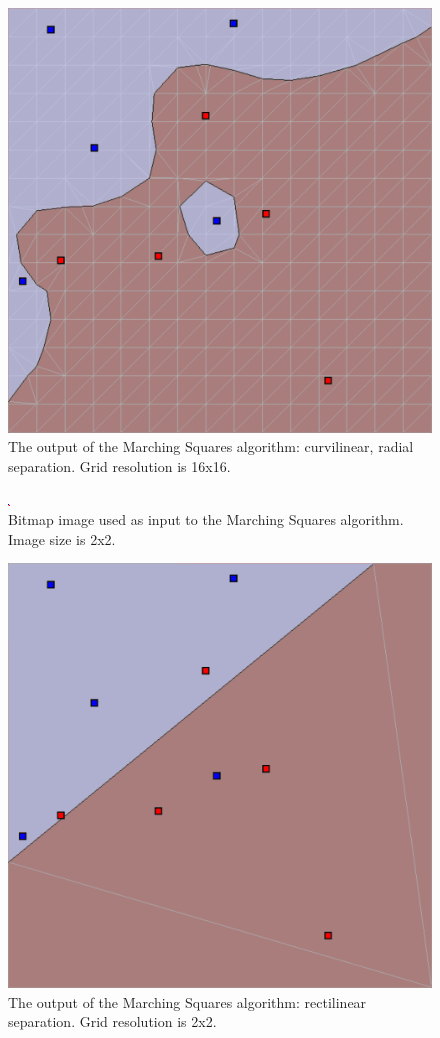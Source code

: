 \documentclass[12pt]{article}
\begin{document}
\begin{figure} 
\centering
  \includegraphics[width = 3 in]{16_res.png}
  \caption{The output of the Marching Squares algorithm: curvilinear, radial separation. Grid resolution is 16x16.
}
\end{figure}

\begin{figure} 
\centering
  \includegraphics[width = 3 in]{2_res_image.png}
  \caption{Bitmap image used as input to the Marching Squares algorithm.
Image size is 2x2.
}
\end{figure}


\begin{figure} 
\centering
  \includegraphics[width = 3 in]{2_res.png}
  \caption{The output of the Marching Squares algorithm: rectilinear separation. Grid resolution is 2x2.
}
\end{figure}
\end{document}
